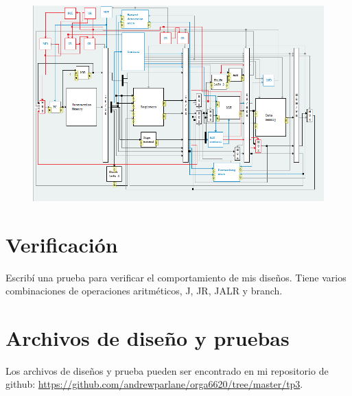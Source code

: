 \documentclass[a4paper]{article}
\begin{document}
\begin{figure}[h]
\centering
\includegraphics[scale=.7]{./img/jalr_pipeline.png}
\label{fig:jalr_pipeline}
\end{figure}

\section{Verificación}

Escribí una prueba para verificar el comportamiento de mis diseños. Tiene varios combinaciones de operaciones aritméticos, J, JR, JALR y branch.

\section{Archivos de diseño y pruebas}

Los archivos de diseños y prueba pueden ser encontrado en mi repositorio de github: \url{https://github.com/andrewparlane/orga6620/tree/master/tp3}.
\end{document}
